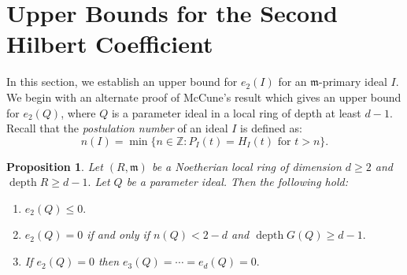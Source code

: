 \documentclass[reqno,a4paper,dvipsnames]{amsart}
\newcommand{\m}{\mathfrak{m} }
\newcommand{\depth}{\operatorname{depth}}
\newtheorem{proposition}[theorem]{Proposition}
\theoremstyle{definition}
\begin{document}
\section{Upper Bounds for the Second Hilbert Coefficient} \label{section4}
In this section, we establish an  upper bound for $e_2(I)$ for an $\m$-primary ideal $I$. 
We begin with an alternate proof of  McCune's result which gives an upper bound for $e_2(Q)$, where $Q$ is a parameter ideal in a local ring of depth at least $d-1$. Recall that the \textit{postulation number} of an ideal $I$ is defined as:
$$n(I)=\min\{n \in \mathbb Z: P_{I}(t)=H_{I}(t) \text{ for } t>n\}.$$  


\begin{proposition}
\label{lori}
\cite[Theorem 3.5]{lori}  Let $(R, \m)$ be a Noetherian local ring of dimension $d \geq 2$ and $\depth R \geq d-1.$ Let $Q$ be a parameter ideal. Then the following hold:
\begin{enumerate}[\normalfont(i)]
    \item
    \label{lori-1}
    $e_{2}(Q) \leq 0.$
    \item 
    \label{lori-2}
    $e_{2}(Q) = 0$ if and only if $n(Q) <2-d$ and  $\depth G(Q) \geq d-1.$
    \item 
    \label{lori-3} If $e_{2}(Q)=0$ then $e_{3}(Q)=\cdots=e_{d}(Q)=0.$
\end{enumerate}
\end{proposition} 
\end{document}
